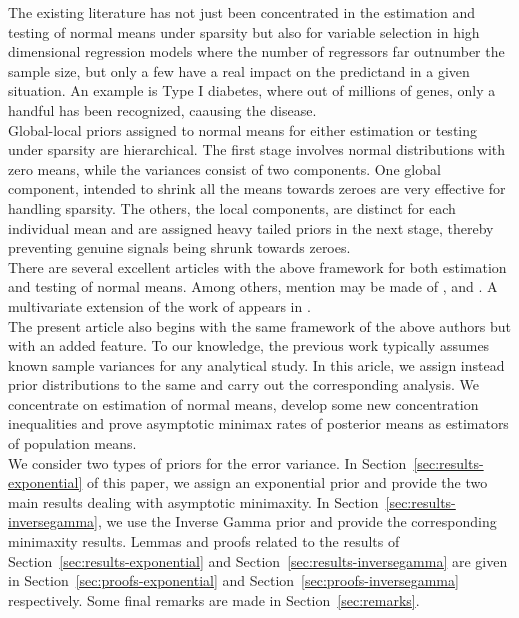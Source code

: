 \documentclass[sn-basic]{sn-jnl}%
\theoremstyle{thmstyleone}%
\begin{document}
\noindent
The existing literature has not just been concentrated in the estimation and testing of normal means under sparsity but also for variable selection in high dimensional regression models where the number of regressors far outnumber the sample size, but only a few have a real impact on the 
predictand in a given situation. An example is Type I diabetes, where out of millions of genes, only a handful has been recognized, caausing the disease.\\

\noindent
Global-local priors assigned to normal means for either estimation or testing under sparsity are hierarchical. The first stage involves normal distributions with zero means, while the variances consist of two components. One global
component, intended to shrink all the means towards zeroes are very effective for handling sparsity. The others, the local components, are distinct for each individual mean and are assigned heavy tailed priors in the next stage, thereby preventing genuine signals being shrunk towards zeroes.\\

\noindent
There are several excellent articles with the above framework for both estimation and testing of normal means. Among others, mention may be made of \citet{vanderpas2014}, \citet{vanderpas2016} and \citet{ghosh2017}. A multivariate
extension of the work of \cite{ghosh2017} appears in \citet{qin2024}.\\

\noindent
The present article also begins with the same framework of the above authors but with an added feature. To our knowledge, the previous work typically assumes known sample variances for any analytical study. In this aricle, we assign instead prior distributions to the same and carry out the
corresponding analysis. We concentrate on estimation of normal means, develop some new concentration inequalities and prove asymptotic minimax rates of posterior means as estimators of population means. \\

\noindent
We consider two types of priors for the error variance. In Section~\ref{sec:results-exponential} of this paper, we assign an exponential prior and provide the two main results dealing with asymptotic minimaxity. In Section~\ref{sec:results-inversegamma}, we use the Inverse Gamma prior and provide the corresponding minimaxity results. Lemmas and proofs related to the results of Section~\ref{sec:results-exponential} and Section~\ref{sec:results-inversegamma} are given in Section~\ref{sec:proofs-exponential} and Section~\ref{sec:proofs-inversegamma} respectively. Some final remarks are made in Section~\ref{sec:remarks}.\\
\end{document}
